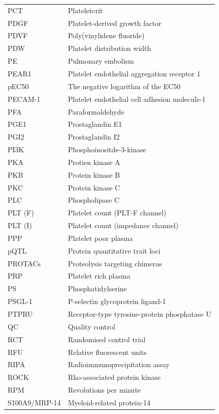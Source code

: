 \documentclass[11pt,twoside]{bristolthesis}
\begin{document}
\begin{abbreviations}
\begin{longtable}[t]{ll}
    PCT & Plateletcrit\\
    PDGF & Platelet-derived growth factor\\
    PDVF & Poly(vinylidene fluoride)\\
    \addlinespace
    PDW & Platelet distribution width\\
    PE & Pulmonary embolism\\
    PEAR1 & Platelet endothelial aggregation receptor 1\\
    pEC50 & The negative logarithm of the EC50\\
    PECAM-1 & Platelet endothelial cell adhesion molecule-1\\
    \addlinespace
    PFA & Paraformaldehyde\\
    PGE1 & Prostaglandin E1\\
    PGI2 & Prostaglandin I2\\
    PI3K & Phosphoinositde-3-kinase\\
    PKA & Protien kinase A\\
    \addlinespace
    PKB & Protein kinase B\\
    PKC & Protein kinase C\\
    PLC & Phospholipase C\\
    PLT (F) & Platelet count (PLT-F channel)\\
    PLT (I) & Platelet count (impedance channel)\\
    \addlinespace
    PPP & Platelet poor plasma\\
    pQTL & Protein quantitative trait loci\\
    PROTACs & Proteolysis targeting chimeras\\
    PRP & Platelet rich plasma\\
    PS & Phosphatidylserine\\
    \addlinespace
    PSGL-1 & P-selectin glycoprotein ligand-1\\
    PTPRU & Receptor-type tyrosine-protein phosphatase U\\
    QC & Quality control\\
    RCT & Randomised control trial\\
    RFU & Relative fluorescent units\\
    \addlinespace
    RIPA & Radioimmunoprecipitation assay\\
    ROCK & Rho-associated protein kinase\\
    RPM & Revolutions per minute\\
    S100A9/MRP-14 & Myeloid-related protein-14\\

\end{longtable}
\end{abbreviations}
\end{document}
